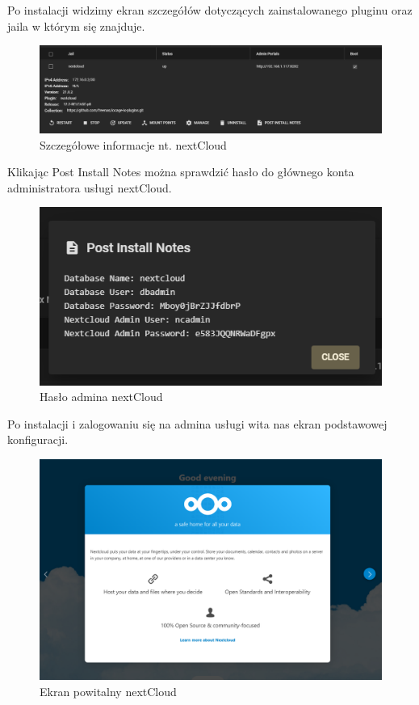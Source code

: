 \documentclass[12pt,a4paper]{article}
\newcommand{\<}{\langle}
\renewcommand{\>}{\rangle}
\theoremstyle{definition}
\begin{document}
Po instalacji widzimy ekran szczegółów dotyczących zainstalowanego pluginu oraz jaila w którym się znajduje.

\begin{figure}[H]
    \centering
    \includegraphics[width=\linewidth]{img/ss_cloud/30.png}
    \caption{Szczegółowe informacje nt. nextCloud}
\end{figure}

Klikając Post Install Notes można sprawdzić hasło do głównego konta administratora usługi nextCloud.

\begin{figure}[H]
    \centering
    \includegraphics[width=13cm]{img/ss_cloud/31.png}
    \caption{Hasło admina nextCloud}
\end{figure}

Po instalacji i zalogowaniu się na admina usługi wita nas ekran podstawowej konfiguracji.

\begin{figure}[H]
    \centering
    \includegraphics[width=\linewidth]{img/ss_cloud/32.png}
    \caption{Ekran powitalny nextCloud}
\end{figure}
\end{document}
